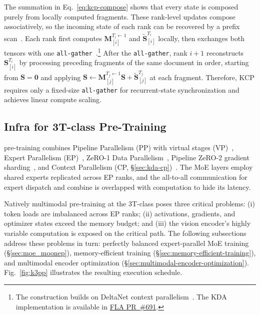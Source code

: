 The summation in Eq.~\ref{eq:kcp-compose} shows that every state is composed purely from locally computed fragments.
These rank-level updates compose associatively, so the incoming state of each rank can be recovered by a prefix scan~\citep{martin-2018-parallelizing}.
Each rank first computes $\mathbf{M}_{[i]}^{T_i \leftarrow 1}$ and $\widetilde{\mathbf{S}}_{[i]}^{T_i}$ locally, then exchanges both tensors with one \texttt{all-gather}~\citep{yang2024fla}.\footnote{
    The construction builds on DeltaNet context parallelism~\citep{yywang2025deltanetcp}.
    The KDA implementation is available in \href{https://github.com/fla-org/flash-linear-attention/pull/691}{FLA PR~\#691}.
}
After the \texttt{all-gather}, rank $i+1$ reconstructs $\mathbf{S}_{[i]}^{T_i}$ by processing preceding fragments of the same document in order, starting from $\mathbf{S}=\mathbf{0}$ and applying $\mathbf{S}\leftarrow\mathbf{M}_{[j]}^{T_j \leftarrow 1}\mathbf{S}+\widetilde{\mathbf{S}}_{[j]}^{T_j}$ at each fragment.
Therefore, KCP requires only a fixed-size \texttt{all-gather} for recurrent-state synchronization and achieves linear compute scaling.



\subsection{Infra for 3T-class Pre-Training}
\label{sec:infra-training}


 pre-training combines Pipeline Parallelism (PP) with virtual stages (VP)~\citep{huang2019gpipe, narayanan2021efficient}, Expert Parallelism (EP)~\citep{lepikhin2020gshard}, ZeRO-1 Data Parallelism~\citep{rajbhandari2020zero}, Pipeline ZeRO-2 gradient sharding~\citep{glm5team2026glm5vibecodingagentic}, and Context Parallelism (CP, \S\ref{sec:kda-cp})~\citep{jacobs2023deepspeedulyssesoptimizationsenabling}.
The MoE layers employ shared experts replicated across EP ranks, and the all-to-all communication for expert dispatch and combine is overlapped with computation to hide its latency.

Natively multimodal pre-training at the 3T-class poses three critical problems: (i) token loads are imbalanced across EP ranks; (ii) activations, gradients, and optimizer states exceed the memory budget; and (iii) the vision encoder's highly variable computation is exposed on the critical path.
The following subsections address these problems in turn: perfectly balanced expert-parallel MoE training (\S\ref{sec:moe_moonep}), memory-efficient training (\S\ref{sec:memory-efficient-training}), and multimodal encoder optimization (\S\ref{sec:multimodal-encoder-optimization}).
Fig.~\ref{fig:k3pp} illustrates the resulting execution schedule.

